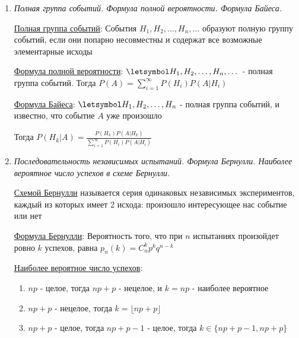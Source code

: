 \documentclass[12pt]{article}
\begin{document}
\begin{enumerate}
    \hyperlink{eventsmultiplicationformula}{Формула умножения событий}:

    Для двух событий: $P(AB) = P(B) \cdot P(A|B) = P(A) \cdot P(B|A)$

    В общем случае: $P(A_1 A_2 A_3 \dots A_n) = P(A_1) P(A_2 | A_1) P(A_3 | A_1 A_2) \dots P(A_n | A_1 A_2 \dots A_{n - 1})$

    \item \textit{Полная группа событий. Формула полной вероятности. Формула Байеса.}

    \hyperlink{completegroupofevents}{Полная группа событий}: События $H_1, H_2, \dots, H_n, \dots$ образуют полную группу событий, если они попарно несовместны и содержат все возможные элементарные исходы

    \hyperlink{formulaofcompleteprobability}{Формула полной вероятности}: $\letsymbol H_1, H_2, \dots, H_n, \dots$ - полная группа событий. Тогда $P(A) = \sum_{i = 1}^\infty P(H_i) P(A | H_i)$
    
    \hyperlink{bayesformula}{Формула Байеса}: $\letsymbol H_1, H_2, \dots, H_n$ - полная группа событий, и известно, что событие $A$ уже произошло

    Тогда $P(H_k | A) = \frac{P(H_k) P(A | H_k)}{\sum_{i = 1}^\infty P(H_i) P(A | H_i)}$

    \item \textit{Последовательность независимых испытаний. Формула Бернулли. Наиболее вероятное число успехов в схеме Бернулли.}

    \hyperlink{bernoullischema}{Схемой Бернулли} называется серия одинаковых независимых экспериментов, каждый из которых имеет 2 исхода: произошло интересующее нас событие или нет

    \hyperlink{bernoulliformula}{Формула Бернулли}: Вероятность того, что при $n$ испытаниях произойдет ровно $k$ успехов, равна
    $p_n(k) = C_n^k p^k q^{n - k}$

    \hyperlink{themostprobablenumberofsuccesses}{Наиболее вероятное число успехов}: 

    \begin{enumerate}
        \item $np$ - целое, тогда $np + p$ - нецелое, и $k = np$ - наиболее вероятное

        \item $np + p$ - нецелое, тогда $k = \lfloor np + p \rfloor$

        \item $np + p$ - целое, тогда $np + p - 1$ - целое, тогда $k \in \{np + p - 1, np + p\}$
    \end{enumerate}


\end{enumerate}
\end{document}
